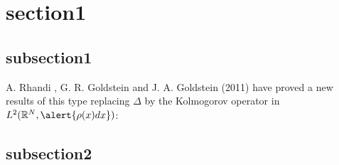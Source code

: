 \documentclass{beamer}
\begin{document}
\section{section1}
\subsection{subsection1}
\begin{frame}{}
A. Rhandi , G. R. Goldstein and J. A. Goldstein (2011) have proved a new 
results of this type replacing \alert{$\Delta$} by the Kolmogorov 
operator in $L^2(\mathbb{R}^N,\alert{\rho(x)dx})$:
\end{frame}

\subsection{subsection2}
\begin{frame}{}

\end{frame}
\end{document}
